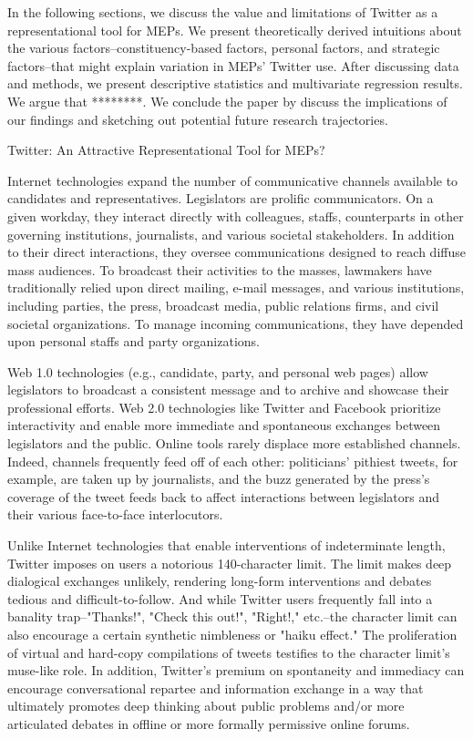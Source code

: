 \documentclass{article}\usepackage[]{graphicx}\usepackage[]{color}
\begin{document}
		In the following sections, we discuss the value and limitations of Twitter as a representational tool for MEPs. We present theoretically derived intuitions about the various factors--constituency-based factors, personal factors, and strategic factors--that might explain variation in MEPs' Twitter use. After discussing data and methods, we present descriptive statistics and multivariate regression results. We argue that ********. We conclude the paper by discuss the implications of our findings and sketching out potential future research trajectories.
		
		
	 Twitter: An Attractive Representational Tool for MEPs? 
	 
		Internet technologies expand the number of communicative channels available to candidates and representatives. Legislators are prolific communicators. On a given workday, they interact directly with colleagues, staffs, counterparts in other governing institutions, journalists, and various societal stakeholders. In addition to their direct interactions, they oversee communications designed to reach diffuse mass audiences. To broadcast their activities to the masses, lawmakers have traditionally relied upon direct mailing, e-mail messages, and various institutions, including parties, the press, broadcast media, public relations firms, and civil societal organizations. To manage incoming communications, they have depended upon personal staffs and party organizations. 
		
		Web 1.0 technologies (e.g., candidate, party, and personal web pages) allow legislators to broadcast a consistent message and to archive and showcase their professional efforts\citep*{adler.gent.overmeyer.1998}. Web 2.0 technologies like Twitter and Facebook prioritize interactivity and enable more immediate and spontaneous exchanges between legislators and the public. Online tools rarely displace more established channels. Indeed, channels frequently feed off of each other: politicians' pithiest tweets, for example, are taken up by journalists, and the buzz generated by the press's coverage of the tweet feeds back to affect interactions between legislators and their various face-to-face interlocutors.
	 
		Unlike Internet technologies that enable interventions of indeterminate length, Twitter imposes on users a notorious 140-character limit. The limit makes deep dialogical exchanges unlikely, rendering long-form interventions and debates tedious and difficult-to-follow. And while Twitter users frequently fall into a banality trap--"Thanks!", "Check this out!", "Right!," etc.--the character limit can also encourage a certain synthetic nimbleness or "haiku effect." The proliferation of virtual and hard-copy compilations of tweets testifies to the character limit's muse-like role. In addition, Twitter's premium on spontaneity and immediacy can encourage conversational repartee and information exchange in a way that ultimately promotes deep thinking about public problems and/or more articulated debates in offline or more formally permissive online forums. 
	 
\end{document}
